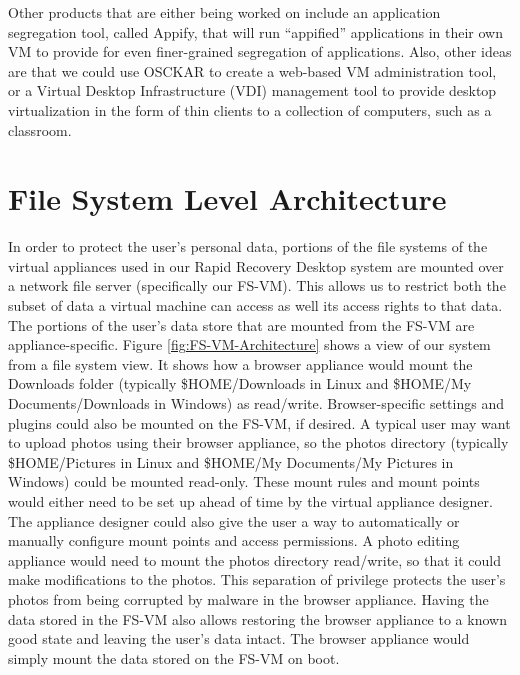 Other products that are either being worked on include an application segregation tool, called Appify, that will run ``appified'' applications in their own VM to provide for even finer-grained segregation of applications. Also, other ideas are that we could use OSCKAR to create a web-based VM administration tool, or a Virtual Desktop Infrastructure (VDI) management tool to provide desktop virtualization in the form of thin clients to a collection of computers, such as a classroom.

\section{File System Level Architecture}

In order to protect the user's personal data, portions of the file systems of the virtual appliances used in our Rapid Recovery Desktop system are mounted over a network file server (specifically our FS-VM). This allows us to restrict both the subset of data a virtual machine can access as well its access rights to that data. The portions of the user's data store that are mounted from the FS-VM are appliance-specific. Figure \ref{fig:FS-VM-Architecture} shows a view of our system from a file system view. It shows how a browser appliance would  mount the Downloads folder (typically \$HOME/Downloads in Linux and \$HOME/My Documents/Downloads in Windows) as read/write. Browser-specific settings and plugins could also be mounted on the FS-VM, if desired. A typical user may want to upload photos using their browser appliance, so the photos directory (typically \$HOME/Pictures in Linux and \$HOME/My Documents/My Pictures in Windows) could be mounted read-only. These mount rules and mount points would either need to be set up ahead of time by the virtual appliance designer. The appliance designer could also give the user a way to automatically or manually configure mount points and access permissions. A photo editing appliance would need to mount the photos directory read/write, so that it could make modifications to the photos. This separation of privilege protects the user's photos from being corrupted by malware in the browser appliance. Having the data stored in the FS-VM also allows restoring the browser appliance to a known good state and leaving the user's data intact. The browser appliance would simply mount the data stored on the FS-VM on boot.

